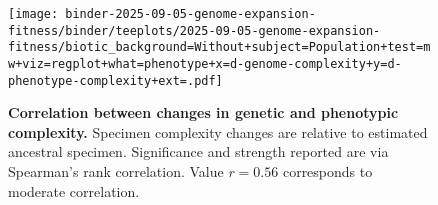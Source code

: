\begin{figure}
\centering
\texttt{[image: binder-2025-09-05-genome-expansion-fitness/binder/teeplots/2025-09-05-genome-expansion-fitness/biotic\_background=Without+subject=Population+test=mw+viz=regplot+what=phenotype+x=d-genome-complexity+y=d-phenotype-complexity+ext=.pdf]}

\vspace{-1ex}

\caption{%
\textbf{Correlation between changes in genetic and phenotypic complexity.}
\footnotesize
Specimen complexity changes are relative to estimated ancestral specimen.
Significance and strength reported are via Spearman's rank correlation.
Value $r=0.56$ corresponds to moderate correlation.
}
\label{fig:gpcomplex-correlation}
\end{figure}
